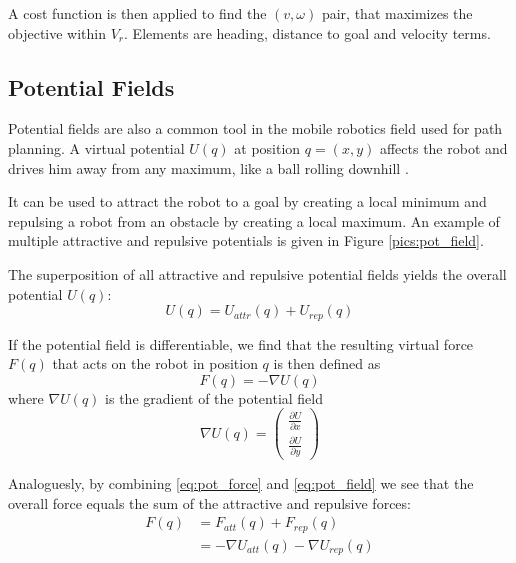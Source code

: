 A cost function is then applied to find the $(v,\omega)$ pair, that maximizes the objective within $V_r$. Elements are heading, distance to goal and velocity terms.

\subsection{Potential Fields}
	\label{sec:pot_field}
Potential fields are also a common tool in the mobile robotics field used for path planning. A virtual potential $U(q)$ at position $q = (x,y)$ affects the robot and drives him away from any maximum, like a ball rolling downhill \citep{siegwart2004autonomous}.

It can be used to attract the robot to a goal by creating a local minimum and repulsing a robot from an obstacle by creating a local maximum. An example of multiple attractive and repulsive potentials is given in Figure \ref{pics:pot_field}.

The superposition of all attractive and repulsive potential fields yields the overall potential $U(q)$:
\begin{equation}
U(q) = U_{attr}(q) + U_{rep}(q)
	\label{eq:pot_field}
\end{equation}

If the potential field is differentiable, we find that the resulting virtual force $F(q)$ that acts on the robot in position $q$ is then defined as 
\begin{equation}
F(q) = - \nabla U(q) 
	\label{eq:pot_force}
\end{equation}
where $\nabla U(q)$ is the gradient of the potential field
\begin{equation}
\nabla U(q) = \begin{pmatrix}
\frac{\partial U}{\partial x} \\
\frac{\partial U}{\partial y}
\end{pmatrix}
	\label{eq:gradient}
\end{equation}

Analoguesly, by combining \ref{eq:pot_force} and \ref{eq:pot_field} we see that the overall force equals the sum of the attractive and repulsive forces:
\begin{equation}
\begin{aligned}
F(q) &= F_{att}(q) + F_{rep}(q) \\
&= -\nabla U_{att}(q)-\nabla U_{rep}(q)
\end{aligned}
\end{equation}


